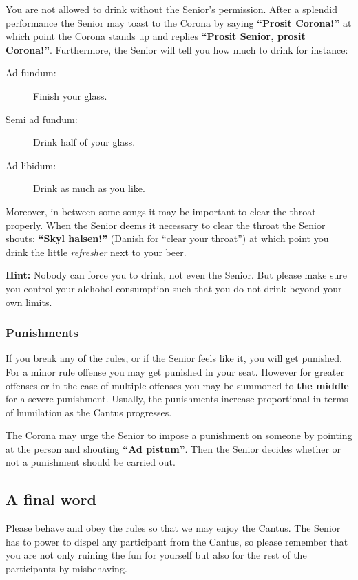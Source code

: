 You are not allowed to drink without the Senior's permission.
After a splendid performance the Senior may toast to the Corona by saying \textbf{``Prosit Corona!''} at which point the Corona stands up and replies \textbf{``Prosit Senior, prosit Corona!''}. Furthermore, the Senior will tell you how much to drink for instance:
\begin{description}
        \item[Ad fundum:] Finish your glass.
        \item[Semi ad fundum:] Drink half of your glass.
        \item[Ad libidum:] Drink as much as you like.
\end{description}
Moreover, in between some songs it may be important to clear the throat properly. When the Senior deems it necessary to clear the throat the Senior shouts: \textbf{``Skyl halsen!''} (Danish for ``clear your throat'') at which point you drink the little \emph{refresher} next to your beer.

\textbf{Hint:} Nobody can force you to drink, not even the Senior. But please make sure you control your alchohol consumption such that you do not drink beyond your own limits.

\subsubsection*{Punishments}
If you break any of the rules, or if the Senior feels like it, you will get punished. For a minor rule offense you may get punished in your seat. However for greater offenses or in the case of multiple offenses you may be summoned to \textbf{the middle} for a severe punishment. Usually, the punishments increase proportional in terms of humilation as the Cantus progresses.

The Corona may urge the Senior to impose a punishment on someone by pointing at the person and shouting \textbf{``Ad pistum''}. Then the Senior decides whether or not a punishment should be carried out.

\subsection{A final word}
Please behave and obey the rules so that we may enjoy the Cantus.
The Senior has to power to dispel any participant from the Cantus, so please remember that you are not only ruining the fun for yourself but also for the rest of the participants by misbehaving.
